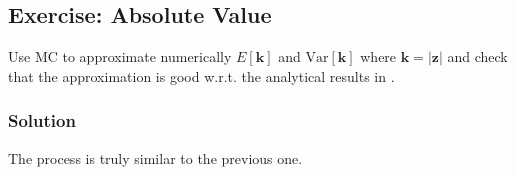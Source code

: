 \documentclass[letterpaper,10pt,english]{jupyterBook}
\begin{document}
\subsection{Exercise: Absolute Value}
\label{\detokenize{01:exercise-absolute-value}}
\sphinxAtStartPar
Use MC to approximate numerically \(E[ {\mathbf k}]\) and \(\mbox{Var}[ {\mathbf k}]\) where \({\mathbf k} = |{\mathbf z}|\) and check that the approximation is good w.r.t. the analytical results in .


\subsubsection{Solution}
\label{\detokenize{01:id5}}
\sphinxAtStartPar
The process is truly similar to the previous one.
\end{document}
